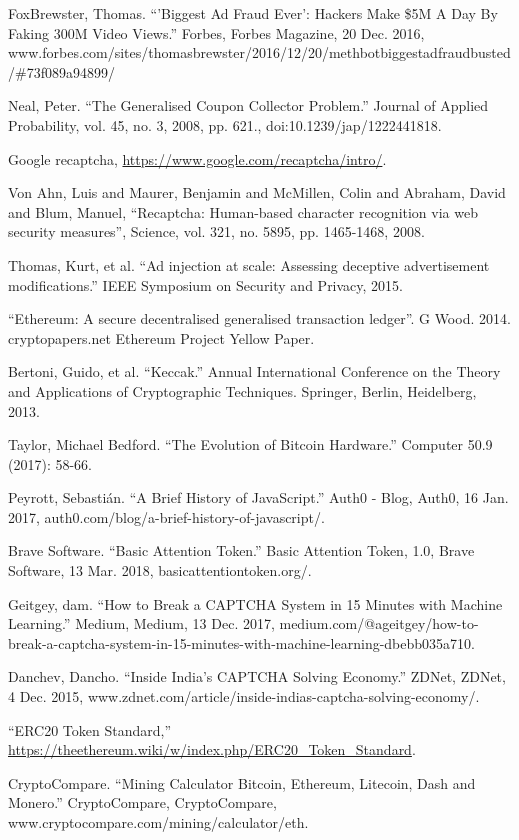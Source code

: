 \documentclass[runningheads]{llncs}
\begin{document}
\begin{thebibliography}{1}
 Fox\-Brewster, Thomas. ``'Biggest Ad Fraud Ever': Hackers Make \$5M A Day By Faking 300M Video Views.'' Forbes, Forbes Magazine, 20 Dec. 2016, www.forbes.com/sites/thomasbrewster/2016/12/20/methbot\-biggest\-ad\-fraud\-busted/\#73f089a94899/ 

 Neal, Peter. ``The Generalised Coupon Collector Problem.'' Journal of Applied Probability, vol. 45, no. 3, 2008, pp. 621., doi:10.1239/jap/1222441818.


 Google recaptcha, \url{https://www.google.com/recaptcha/intro/}.

 Von Ahn, Luis and Maurer, Benjamin and McMillen, Colin and Abraham, David and Blum, Manuel, ``Recaptcha: Human-based character recognition via web security measures'', Science, vol. 321, no. 5895, pp. 1465-1468, 2008.

 Thomas, Kurt, et al. ``Ad injection at scale: Assessing deceptive advertisement modifications.'' IEEE Symposium on Security and Privacy, 2015.

 ``Ethereum: A secure decentralised generalised transaction ledger''. G Wood. 2014. cryptopapers.net Ethereum Project Yellow Paper.

 Bertoni, Guido, et al. ``Keccak.'' Annual International Conference on the Theory and Applications of Cryptographic Techniques. Springer, Berlin, Heidelberg, 2013.

 Taylor, Michael Bedford. ``The Evolution of Bitcoin Hardware.'' Computer 50.9 (2017): 58-66.

 Peyrott, Sebastián. ``A Brief History of JavaScript.'' Auth0 - Blog, Auth0, 16 Jan. 2017, auth0.com/blog/a-brief-history-of-javascript/. 

 Brave Software. ``Basic Attention Token.'' Basic Attention Token, 1.0, Brave Software, 13 Mar. 2018, basicattentiontoken.org/. 

 Geitgey, dam. ``How to Break a CAPTCHA System in 15 Minutes with Machine Learning.'' Medium, Medium, 13 Dec. 2017, medium.com/@ageitgey/how-to-break-a-captcha-system-in-15-minutes-with-machine-learning-dbebb035a710. 

 Danchev, Dancho. ``Inside India's CAPTCHA Solving Economy.'' ZDNet, ZDNet, 4 Dec. 2015, www.zdnet.com/article/inside-indias-captcha-solving-economy/.

 ``ERC20 Token Standard,'' \\\url{https://theethereum.wiki/w/index.php/ERC20\_Token\_Standard}.

 CryptoCompare. ``Mining Calculator Bitcoin, Ethereum, Litecoin, Dash and Monero.'' CryptoCompare, CryptoCompare, 
www.cryptocompare.com/mining/calculator/eth. 
\end{thebibliography}

\addtolength{\textheight}{-7cm}


\end{document}
